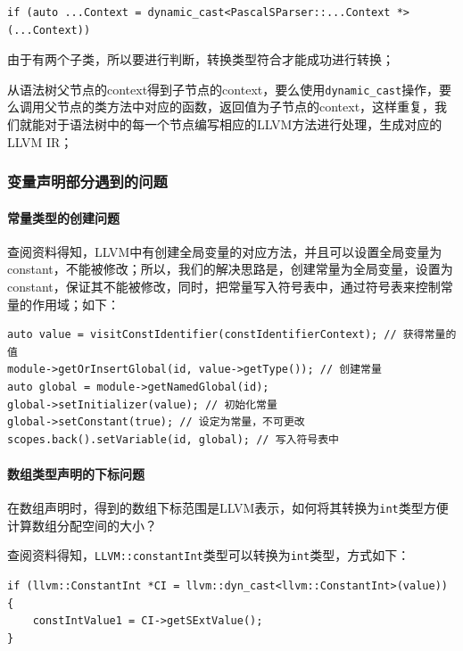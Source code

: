 \documentclass[lang=cn,11pt,a4paper,cite=authornum]{paper}
\begin{document}
\begin{code}
\begin{verbatim}
if (auto ...Context = dynamic_cast<PascalSParser::...Context *>(...Context))
\end{verbatim}
\end{code}

由于有两个子类，所以要进行判断，转换类型符合才能成功进行转换；

从语法树父节点的context得到子节点的context，要么使用\texttt{dynamic_cast}操作，要么调用父节点的类方法中对应的函数，返回值为子节点的context，这样重复，我们就能对于语法树中的每一个节点编写相应的LLVM方法进行处理，生成对应的LLVM IR；

\subsubsection{变量声明部分遇到的问题}

\paragraph{常量类型的创建问题}

查阅资料得知，LLVM中有创建全局变量的对应方法，并且可以设置全局变量为constant，不能被修改；所以，我们的解决思路是，创建常量为全局变量，设置为constant，保证其不能被修改，同时，把常量写入符号表中，通过符号表来控制常量的作用域；如下：

\begin{code}
\begin{verbatim}
auto value = visitConstIdentifier(constIdentifierContext); // 获得常量的值
module->getOrInsertGlobal(id, value->getType()); // 创建常量
auto global = module->getNamedGlobal(id);
global->setInitializer(value); // 初始化常量
global->setConstant(true); // 设定为常量，不可更改
scopes.back().setVariable(id, global); // 写入符号表中
\end{verbatim}
\end{code}

\paragraph{数组类型声明的下标问题}

在数组声明时，得到的数组下标范围是LLVM表示，如何将其转换为\texttt{int}类型方便计算数组分配空间的大小？

查阅资料得知，\texttt{LLVM::constantInt}类型可以转换为\texttt{int}类型，方式如下：

\begin{code}
\begin{verbatim}
if (llvm::ConstantInt *CI = llvm::dyn_cast<llvm::ConstantInt>(value))
{
    constIntValue1 = CI->getSExtValue();
}
\end{verbatim}
\end{code}
\end{document}
